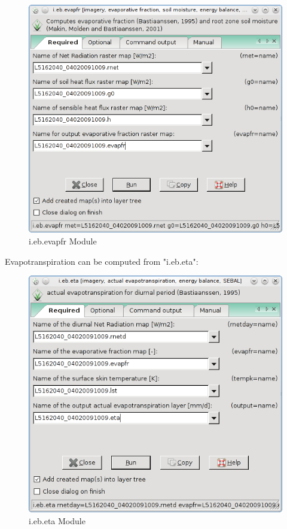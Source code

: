 \begin{figure}[htbp]
   \centering
   \includegraphics[scale=0.4]{gipe023.png}
   \caption{i.eb.evapfr Module}
   \label{fig:gipe023}
\end{figure}

Evapotranspiration can be computed from "i.eb.eta":\newline

\begin{figure}[htbp]
   \centering
   \includegraphics[scale=0.4]{gipe024.png}
   \caption{i.eb.eta Module}
   \label{fig:gipe024}
\end{figure}

